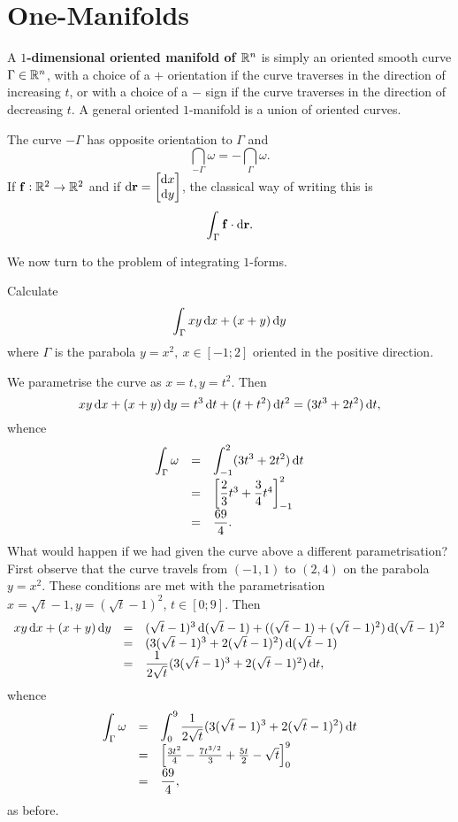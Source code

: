 \section{One-Manifolds}
\begin{df}
A  \textbf{$1$-dimensional  oriented manifold of $\mathbb{R}^n$} is simply
an oriented smooth curve  $\Gamma\in \mathbb{R}^n$, with a choice of a
$+$ orientation if the curve traverses in the direction of
increasing $t$,  or with a choice of a $-$ sign if the curve
traverses in the direction of decreasing $t$. A general oriented
$1$-manifold is a union of oriented curves.
\end{df}
\begin{rem}The curve $-\Gamma$ has opposite orientation to $\Gamma$ and
$$ \dint _{-\Gamma} \omega = -\dint _\Gamma \omega .   $$If $\mathbf{ f}:\mathbb{R} ^2 \to \mathbb{R}
^2$ and if $\d{\vector{r}} = \colvec{\d{x}\\ \d{y}}$, the classical
way of writing this is $$  \dint _{\Gamma} \vector{f}\cdot
\d{\vector{r}}.
$$
\end{rem}
We now turn to the problem of integrating $1$-forms.
\begin{exa}
Calculate
$$\dint _\Gamma xy\d{x} + (x + y)\d{y}$$ where $\Gamma$ is the parabola
$y = x^2, \ x \in [-1; 2]$ oriented in the positive direction.
\end{exa}
\begin{solu} We parametrise the curve as $x = t, y = t^2$. Then
$$xy\d{x} + (x + y)\d{y} = t^3\d{t} + (t + t^2)\d{t^2} = (3t^3 + 2t^2)\d{t},    $$
whence
$$\begin{array}{lll}
\dint _{\Gamma} \omega & = & \dint _{-1} ^2 (3t^3 + 2t^2)\d{t} \\
& = & \left[\dfrac{2}{3}t^3  + \dfrac{3}{4}t^4\right] _{-1} ^2\\ &
= & \dfrac{69}{4}.
\end{array}$$
What would happen if we had given the curve above a different
parametrisation? First observe that the curve travels from
$(-1,1)$ to $(2,4)$ on the parabola $y = x^2$. These conditions
are met with the parametrisation $x = \sqrt{t} - 1, y =
(\sqrt{t}-1)^2$, $t\in [0; 9]$. Then
$$\begin{array}{lll}xy\d{x} + (x + y)\d{y} & = & (\sqrt{t}-1)^3\d{(\sqrt{t}-1)} + ((\sqrt{t}-1) + (\sqrt{t}-1)^2)\d{(\sqrt{t}-1)^2}\\
& = & (3(\sqrt{t}-1)^3 + 2(\sqrt{t}-1)^2)\d{(\sqrt{t} - 1)} \\
& = & \dfrac{1}{2\sqrt{t}}(3(\sqrt{t}-1)^3 +
2(\sqrt{t}-1)^2)\d{t},
\end{array}$$ whence
$$\begin{array}{lll}
\dint _{\Gamma} \omega & = & \dint _{0} ^9 \dfrac{1}{2\sqrt{t}}(3(\sqrt{t}-1)^3 + 2(\sqrt{t}-1)^2)\d{t} \\
& = &
\left[\frac{3t^2}{4}-\frac{7t^{3/2}}{3}+\frac{5t}{2}-\sqrt{t}\right]
_{0} ^9\\[1ex] & = & \dfrac{69}{4},\\
\end{array}$$as before.







\end{solu}

